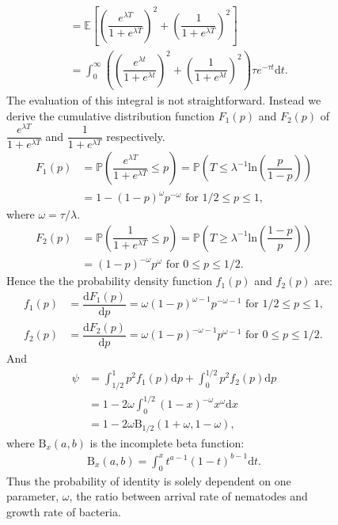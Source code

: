 \documentclass[10pt]{article}
\newcommand{\ud}{{\mathrm{d}}}
\newcommand{\pr}{{\mathbb{P}}}
\newcommand{\psic}{\psi}
\begin{document}
\begin{multicols}{2}
\begin{figure*}[hbt!]
\begin{mdframed}
\begin{multicols}{2}
\begin{align}
  &=\mathbb{E} \left[ \left( \dfrac{ e^{\lambda T}}{1+e^{\lambda T}} \right)^2+\left( \dfrac{1}{1+e^{\lambda T}} \right)^2 \right] \\
  &=\int_0^\infty \left( \left( \dfrac{ e^{\lambda t}}{1+e^{\lambda t}} \right)^2 + \left( \dfrac{1}{1+e^{\lambda t}} \right)^2 \right) \tau e^{ -\tau t } \ud t.
  \end{align}
  The evaluation of this integral is not straightforward.
  Instead we derive the cumulative distribution function $F_1(p)$ and $F_2(p)$ of $\dfrac{ e^{\lambda T}}{1+e^{\lambda T}}$ and $\dfrac{ 1}{1+e^{\lambda T}}$ respectively.
  \begin{align}
  F_1(p) &= \pr \left(\dfrac{e^{\lambda T}}{1+e^{\lambda T}} \leq p\right)= \pr \left(T \leq \lambda^{-1} \mathrm{ln}\left( \dfrac{p}{1-p} \right) \right) \nonumber \\
  &= 1-(1-p)^{\omega} p^{-\omega} \text{ for } 1/2 \leq p \leq 1,
  \end{align}
  where $\omega=\tau / \lambda$.
  \begin{align}
  F_2(p) &= \pr \left(\dfrac{1}{1+e^{\lambda T}} \leq p\right) = \pr \left(T \geq \lambda^{-1} \mathrm{ln}\left( \dfrac{1-p}{p} \right) \right) \nonumber \\
  &= (1-p)^{-\omega} p^\omega \text{ for } 0 \leq p \leq 1/2.
  \end{align}
  Hence the the probability density function $f_1(p)$ and $f_2(p)$ are:
  \begin{align}
  f_1(p) &= \dfrac{ \ud F_1(p) }{ \ud p} =  \omega (1-p)^{\omega-1} p^{-\omega-1}  \text{ for } 1/2 \leq p \leq 1,\\
  f_2(p) &= \dfrac{ \ud F_2(p) }{ \ud p} =  \omega (1-p)^{-\omega-1} p^{\omega-1} \text{ for } 0 \leq p \leq 1/2.
  \end{align}
  And
  \begin{align}
  \psic &= \int_{1/2}^{1} p^2 f_1(p) \ud p + \int_{0}^{1/2} p^2 f_2(p) \ud p \\
  &= 1 -2  \omega \int_{0}^{1/2}  (1-x)^{-\omega} x^{\omega}  \ud x \\
  &= 1- 2 \omega \mathrm{B}_{1/2}(1+\omega,1-\omega),
  \end{align}
  where $\mathrm{B}_x(a,b)$ is the incomplete beta function:
\begin{align}
\mathrm{B}_x(a,b) = \int_0^x t^{a-1}(1-t)^{b-1} \ud t.
\end{align}
  Thus the probability of identity is solely dependent on one parameter, $\omega$, the ratio between arrival rate of nematodes and growth rate of bacteria.

\end{multicols}
\end{mdframed}
\end{figure*}
\end{multicols}
\end{document}
